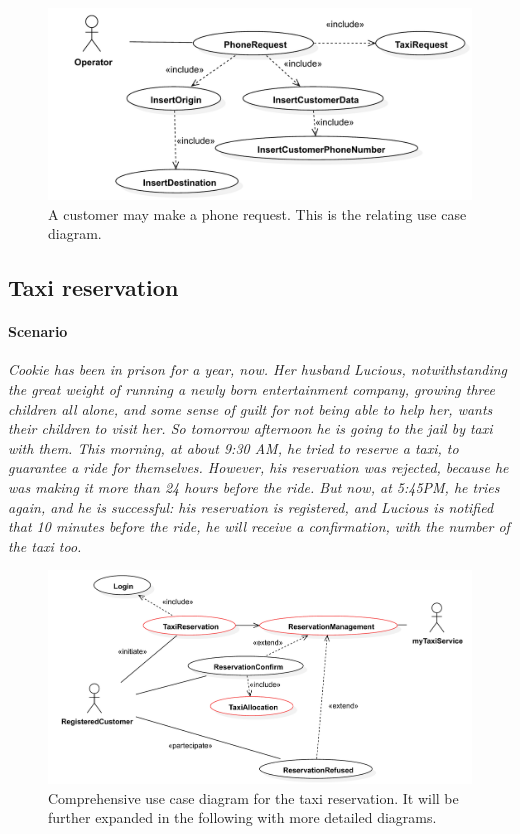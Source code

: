 \begin{figure}
	\includegraphics[width=\textwidth]{img/U_PhoneRequest}
	\caption{A customer may make a phone request. This is the relating use case diagram.}
\end{figure}	




\subsection{Taxi reservation}%


\paragraph{Scenario}{\small\itshape Cookie has been in prison for a year, now. Her husband Lucious, notwithstanding the great weight of running a newly born entertainment company, growing three children all alone, and some sense of guilt for not being able to help her, wants their children to visit her. So tomorrow afternoon he is going to the jail by taxi with them. This morning, at about 9:30 AM, he tried to reserve a taxi, to guarantee a ride for themselves. However, his reservation was rejected, because he was making it more than \num{24} hours before the ride. But now, at 5:45PM, he tries again, and he is successful: his reservation is registered, and Lucious is notified that \num{10} minutes before the ride, he will receive a confirmation, with the number of the taxi too.}


\clearpage


\begin{figure}
	\centering
	\includegraphics[width=\textwidth]{img/U_TaxiReservationGLOBAL}
	\caption{Comprehensive use case diagram for the taxi reservation. It will be further expanded in the following with more detailed diagrams.}
\end{figure}


